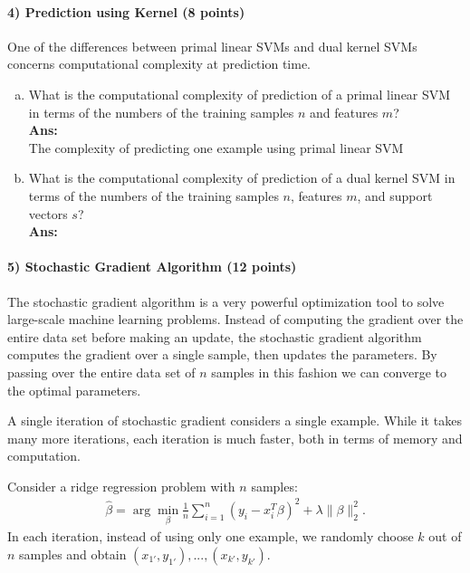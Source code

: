 \documentclass[11pt]{article}
\begin{document}
\paragraph{4) Prediction using Kernel (8 points)} 
One of the differences between primal linear SVMs and dual kernel SVMs concerns computational complexity at prediction time.
\begin{enumerate}[(a)]
\item What is the computational complexity of prediction of a primal linear SVM in terms of the numbers of the training samples $n$ and features $m$?\\
\textbf{Ans:}\\
The complexity of predicting one example using primal linear SVM 


\item What is the computational complexity of prediction of a dual kernel SVM in terms of the numbers of the training samples $n$, features $m$, and support vectors $s$?\\
\textbf{Ans:}\\

\end{enumerate}

\paragraph{5) Stochastic Gradient Algorithm (12 points)}

The stochastic gradient algorithm is a very powerful optimization tool to solve large-scale machine learning problems. Instead of computing the gradient over the entire data set before making an update, the stochastic gradient algorithm computes the gradient over a single sample, then updates the parameters. By passing over the entire data set of $n$ samples in this fashion we can converge to the optimal parameters.

A single iteration of stochastic gradient considers a single example.
While it takes many more iterations, each iteration is much faster, both in terms of memory and computation.

Consider a ridge regression problem with $n$ samples:
\begin{align}
\hat{\beta} = \arg\min_{\beta}\frac{1}{n}\sum_{i=1}^n(y_i - x_i^T\beta)^2 + \lambda\|\beta\|_2^2.
\end{align}
In each iteration, instead of using only one example, we randomly choose $k$ out of $n$ samples and obtain $(x_{1'},y_{1'}),...,(x_{k'},y_{k'})$. 
\end{document}
